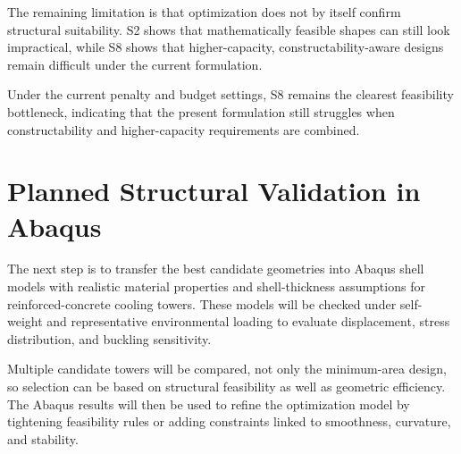 The remaining limitation is that optimization does not by itself confirm structural suitability. S2 shows that mathematically feasible shapes can still look impractical, while S8 shows that higher-capacity, constructability-aware designs remain difficult under the current formulation.


Under the current penalty and budget settings, S8 remains the clearest feasibility bottleneck, indicating that the present formulation still struggles when constructability and higher-capacity requirements are combined.


\section{Planned Structural Validation in Abaqus}


The next step is to transfer the best candidate geometries into Abaqus shell models with realistic material properties and shell-thickness assumptions for reinforced-concrete cooling towers. These models will be checked under self-weight and representative environmental loading to evaluate displacement, stress distribution, and buckling sensitivity.


Multiple candidate towers will be compared, not only the minimum-area design, so selection can be based on structural feasibility as well as geometric efficiency. The Abaqus results will then be used to refine the optimization model by tightening feasibility rules or adding constraints linked to smoothness, curvature, and stability.

